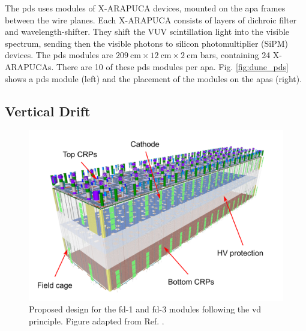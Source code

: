 The \gls{pds} uses modules of X-ARAPUCA devices, mounted on the \gls{apa} frames between the wire planes. Each X-ARAPUCA consists of layers of dichroic filter and wavelength-shifter. They shift the VUV scintillation light into the visible spectrum, sending then the visible photons to silicon photomultiplier (SiPM) devices. The \gls{pds} modules are $209~\mathrm{cm}\times12~\mathrm{cm}\times2~\mathrm{cm}$ bars, containing 24 X-ARAPUCAs. There are 10 of these \gls{pds} modules per \gls{apa}. Fig. \ref{fig:dune_pds} shows a \gls{pds} module (left) and the placement of the modules on the \gls{apa}s (right).

\subsection{Vertical Drift}

\begin{figure}[t]
	\centering
	\includegraphics[width=0.70\linewidth]{Images/DUNE/FD/dune_vd}
	\caption[Proposed design for the \gls{fd}-1 and \gls{fd}-3 modules following the \gls{vd} principle.]{Proposed design for the \gls{fd}-1 and \gls{fd}-3 modules following the \gls{vd} principle. Figure adapted from Ref. \cite{DUNEVDTDR}.}
	\label{fig:dune_vd}
\end{figure}

